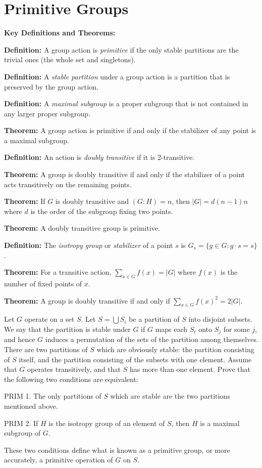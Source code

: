 \section{Primitive Groups}

\textbf{Key Definitions and Theorems:}

\textbf{Definition:} A group action is \textit{primitive} if the only stable partitions are the trivial ones (the whole set and singletons).

\textbf{Definition:} A \textit{stable partition} under a group action is a partition that is preserved by the group action.

\textbf{Definition:} A \textit{maximal subgroup} is a proper subgroup that is not contained in any larger proper subgroup.

\textbf{Theorem:} A group action is primitive if and only if the stabilizer of any point is a maximal subgroup.

\textbf{Definition:} An action is \textit{doubly transitive} if it is 2-transitive.

\textbf{Theorem:} A group is doubly transitive if and only if the stabilizer of a point acts transitively on the remaining points.

\textbf{Theorem:} If $G$ is doubly transitive and $(G : H) = n$, then $|G| = d(n-1)n$ where $d$ is the order of the subgroup fixing two points.

\textbf{Theorem:} A doubly transitive group is primitive.

\textbf{Definition:} The \textit{isotropy group} or \textit{stabilizer} of a point $s$ is $G_s = \{g \in G : g \cdot s = s\}$.

\textbf{Theorem:} For a transitive action, $\sum_{x \in G} f(x) = |G|$ where $f(x)$ is the number of fixed points of $x$.

\textbf{Theorem:} A group is doubly transitive if and only if $\sum_{x \in G} f(x)^2 = 2|G|$.

\begin{problembox}
Let $G$ operate on a set $S$. Let $S = \bigcup S_i$ be a partition of $S$ into disjoint subsets. We say that the partition is stable under $G$ if $G$ maps each $S_i$ onto $S_j$ for some $j$, and hence $G$ induces a permutation of the sets of the partition among themselves. There are two partitions of $S$ which are obviously stable: the partition consisting of $S$ itself, and the partition consisting of the subsets with one element. Assume that $G$ operates transitively, and that $S$ has more than one element. Prove that the following two conditions are equivalent:

PRIM 1. The only partitions of $S$ which are stable are the two partitions mentioned above.

PRIM 2. If $H$ is the isotropy group of an element of $S$, then $H$ is a maximal subgroup of $G$.

These two conditions define what is known as a primitive group, or more accurately, a primitive operation of $G$ on $S$.
\end{problembox}

